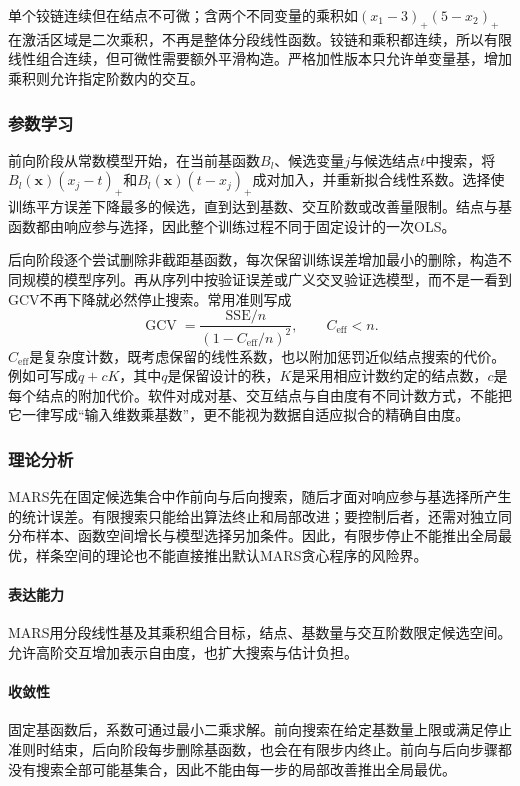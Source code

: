单个铰链连续但在结点不可微；含两个不同变量的乘积如$(x_1-3)_+(5-x_2)_+$在激活区域是二次乘积，不再是整体分段线性函数。铰链和乘积都连续，所以有限线性组合连续，但可微性需要额外平滑构造。严格加性版本只允许单变量基，增加乘积则允许指定阶数内的交互。

\subsubsection{参数学习}

前向阶段从常数模型开始，在当前基函数$B_l$、候选变量$j$与候选结点$t$中搜索，将$B_l(\bm{x})(x_j-t)_+$和$B_l(\bm{x})(t-x_j)_+$成对加入，并重新拟合线性系数。选择使训练平方误差下降最多的候选，直到达到基数、交互阶数或改善量限制。结点与基函数都由响应参与选择，因此整个训练过程不同于固定设计的一次OLS。

后向阶段逐个尝试删除非截距基函数，每次保留训练误差增加最小的删除，构造不同规模的模型序列。再从序列中按验证误差或广义交叉验证选模型，而不是一看到GCV不再下降就必然停止搜索。常用准则写成
\begin{equation}
  \operatorname{GCV}
  =\frac{\mathrm{SSE}/n}{(1-C_{\mathrm{eff}}/n)^2},
  \qquad C_{\mathrm{eff}}<n.
  \label{eq:regression-mars-gcv}
\end{equation}
$C_{\mathrm{eff}}$是复杂度计数，既考虑保留的线性系数，也以附加惩罚近似结点搜索的代价。例如可写成$q+cK$，其中$q$是保留设计的秩，$K$是采用相应计数约定的结点数，$c$是每个结点的附加代价。软件对成对基、交互结点与自由度有不同计数方式，不能把它一律写成“输入维数乘基数”，更不能视为数据自适应拟合的精确自由度。

\subsubsection{理论分析}

MARS先在固定候选集合中作前向与后向搜索，随后才面对响应参与基选择所产生的统计误差。有限搜索只能给出算法终止和局部改进；要控制后者，还需对独立同分布样本、函数空间增长与模型选择另加条件。因此，有限步停止不能推出全局最优，样条空间的理论也不能直接推出默认MARS贪心程序的风险界。

\paragraph{表达能力}
MARS用分段线性基及其乘积组合目标，结点、基数量与交互阶数限定候选空间。允许高阶交互增加表示自由度，也扩大搜索与估计负担。

\paragraph{收敛性}
固定基函数后，系数可通过最小二乘求解。前向搜索在给定基数量上限或满足停止准则时结束，后向阶段每步删除基函数，也会在有限步内终止。前向与后向步骤都没有搜索全部可能基集合，因此不能由每一步的局部改善推出全局最优。

